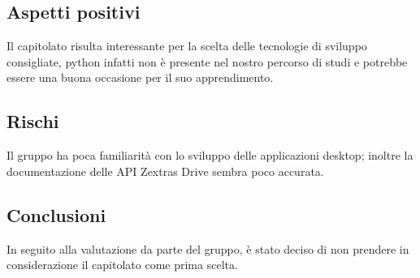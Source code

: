 \documentclass[../studio-di-fattibilita.tex]{subfiles}
\begin{document}
\subsection{Aspetti positivi}%
\label{sub:c7_aspetti_positivi}
Il capitolato risulta interessante per la scelta delle tecnologie di sviluppo consigliate, python infatti non è presente nel nostro percorso di studi e potrebbe essere una buona occasione per il suo apprendimento.

\subsection{Rischi}%
\label{sub:c7_rischi}
Il gruppo ha poca familiarità con lo sviluppo delle applicazioni desktop; inoltre la documentazione delle API Zextras Drive sembra poco accurata.
\subsection{Conclusioni}%
\label{sub:c7_conclusioni}
In seguito alla valutazione da parte del gruppo, è stato deciso di non prendere in considerazione il capitolato come prima scelta.
\end{document}
